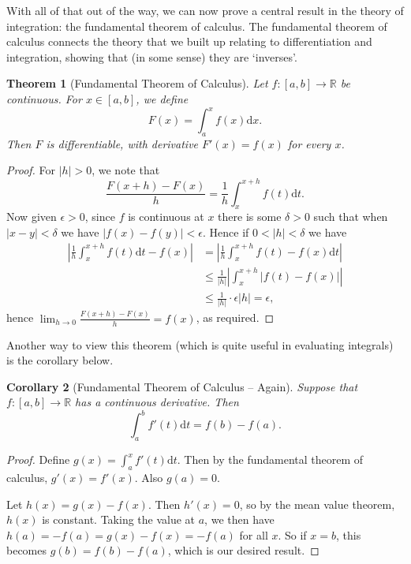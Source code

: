 \documentclass[11pt, a4paper]{article}
\newtheorem{theorem}{Theorem}[section]
\newtheorem{corollary}[theorem]{Corollary}
\theoremstyle{definition}
\newcommand{\R}{\mathbb{R}}
\newcommand{\dd}{\mathrm{d}}
\begin{document}
With all of that out of the way, we can now prove a central result in the theory of integration: the fundamental theorem of calculus. The fundamental theorem of calculus connects the theory that we built up relating to differentiation and integration, showing that (in some sense) they are `inverses'.

\begin{theorem}[Fundamental Theorem of Calculus]
	Let $f: [a, b] \rightarrow \R $ be continuous. For $x \in [a, b]$, we define
	$$
	F(x) = \int_a^x f(x) \dd x.
	$$
	Then $F$ is differentiable, with derivative $F'(x) = f(x)$ for every $x$.
\end{theorem}
\begin{proof}
	For $|h| > 0$, we note that
	$$
	\frac{F(x + h) - F(x)}{h} = \frac{1}{h} \int_x^{x + h} f(t) \dd t.
	$$
	Now given $\epsilon > 0$, since $f$ is continuous at $x$ there is some $\delta > 0$ such that when $|x - y| < \delta$ we have $|f(x) - f(y)| < \epsilon$. Hence if $0 < |h| < \delta$ we have
	\begin{align*}
		\left|\frac{1}{h} \int_x^{x + h} f(t) \dd t - f(x)\right| &= \left|\frac{1}{h} \int_x^{x + h} f(t)  - f(x)\dd t\right| \\
		&\leq \frac{1}{|h|} \left|\int_x^{x + h} |f(t) - f(x)|\right| \\ 
		& \leq \frac{1}{|h|} \cdot \epsilon|h| = \epsilon,
	\end{align*}
	hence $\lim_{h \to 0}\frac{F(x + h)- F(x)}{h} = f(x)$, as required.
\end{proof}


Another way to view this theorem (which is quite useful in evaluating integrals) is the corollary below.

\begin{corollary}[Fundamental Theorem of Calculus -- Again]
	Suppose that $f: [a, b] \rightarrow \R$ has a continuous derivative. Then
	$$
	\int_a^b f'(t) \dd t = f(b) - f(a).
	$$
\end{corollary}
\begin{proof}
	Define $g(x) = \int_a^x f'(t) \dd t$. Then by the fundamental theorem of calculus, $g'(x) = f'(x)$. Also $g(a) = 0$.

	Let $h(x) = g(x) - f(x)$. Then $h'(x) = 0$, so by the mean value theorem, $h(x)$ is constant. Taking the value at $a$, we then have $h(a) = -f(a) = g(x) - f(x) = -f(a)$ for all $x$. So if $x = b$, this becomes $g(b) = f(b) - f(a)$, which is our desired result.
\end{proof}
\end{document}
